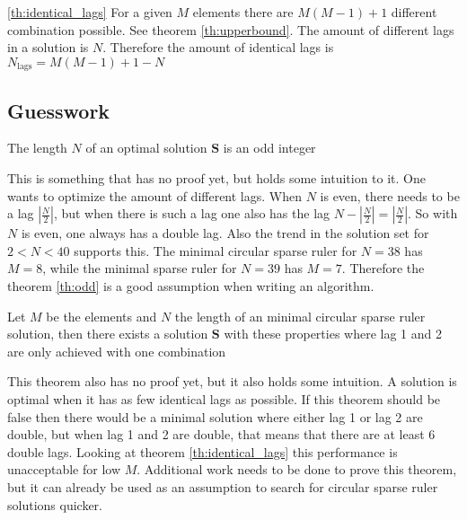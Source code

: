 \documentclass[a4paper, openany, oneside]{memoir}
\begin{document}
\begin{blockProofTheorem}{\ref{th:identical_lags}}
    For a given $M$ elements there are $M(M-1)+1$ different combination possible. See theorem \ref{th:upperbound}. The amount of different lags in a solution is $N$. Therefore the amount of identical lags is $N_{\text{lags}} = M(M-1)+1-N$ 
\end{blockProofTheorem}

\subsection{Guesswork}

\begin{blockTheorem} \label{th:odd}\nolinebreak
    The length $N$ of an optimal solution $\mathbf{S}$ is an odd integer \nolinebreak
\end{blockTheorem}

This is something that has no proof yet, but holds some intuition to it. One wants to optimize the amount of different lags. When $N$ is even, there  needs to be a lag $|\frac{N}{2}|$, but when there is such a lag one also has the lag $N-|\frac{N}{2}|=|\frac{N}{2}|$. So with $N$ is even, one always has a double lag. Also the trend in the solution set for $2<N<40$ supports this. The minimal circular sparse ruler for $N=38$ has $M=8$, while the minimal sparse ruler for $N=39$ has $M=7$. Therefore the theorem \ref{th:odd} is a good assumption when writing an algorithm.

\begin{blockTheorem} \label{th:lag1_2}\nolinebreak
    Let $M$ be the elements and $N$ the length of an minimal circular sparse ruler solution, then there exists a solution $\mathbf{S}$ with these properties where lag 1 and 2 are only achieved with one combination   \nolinebreak
\end{blockTheorem}

This theorem also has no proof yet, but it also holds some intuition. A solution is optimal when it has as few identical lags as possible. If this theorem should be false then there would be a minimal solution where either lag 1 or lag 2 are double, but when lag 1 and 2 are double, that means that there are at least 6 double lags. Looking at theorem \ref{th:identical_lags} this performance is unacceptable for low $M$. Additional work needs to be done to prove this theorem, but it can already be used as an assumption to search for circular sparse ruler solutions quicker.
\end{document}
